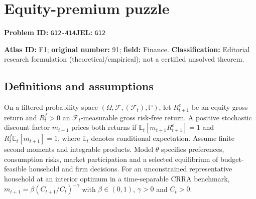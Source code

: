 \documentclass[11pt,a4paper]{article}
\begin{document}
\section*{Equity-premium puzzle}
\textbf{Problem ID:} \texttt{G12-414}\quad \textbf{JEL:} \texttt{G12}\par
\label{problem:OP-0091}
\label{atlas:prob:F1}

\noindent\textbf{Atlas ID:} F1; \textbf{original number:} 91; \textbf{field:} Finance. \textbf{Classification:} Editorial research formulation (theoretical/empirical); not a certified unsolved theorem.

\subsection*{Definitions and assumptions}
On a filtered probability space $(\Omega,\mathcal F,(\mathcal F_t),\mathbb P)$, let $R_{t+1}^e$ be an equity gross return and $R_t^f>0$ an $\mathcal F_t$-measurable gross risk-free return. A positive stochastic discount factor $m_{t+1}$ prices both returns if $\mathbb E_t[m_{t+1}R_{t+1}^e]=1$ and $R_t^f\mathbb E_t[m_{t+1}]=1$, where $\mathbb E_t$ denotes conditional expectation. Assume finite second moments and integrable products. Model $\theta$ specifies preferences, consumption risks, market participation and a selected equilibrium of budget-feasible household and firm decisions. For an unconstrained representative household at an interior optimum in a time-separable CRRA benchmark, $m_{t+1}=\beta(C_{t+1}/C_t)^{-\gamma}$ with $\beta\in(0,1)$, $\gamma>0$ and $C_t>0$.
\end{document}

